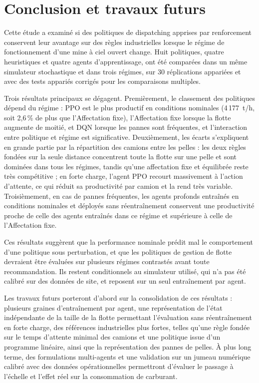 \documentclass[11pt,a4paper]{article}
\newif\ifrevmarks
\newcommand{\revtag}[1]{\ifrevmarks\textsuperscript{\textcolor{red!70!black}{\scriptsize[#1]}}\fi}
\newenvironment{revbloc}[1]{\par\ifrevmarks\color{revcolor}\noindent\revtag{#1}\ \fi}{\par}
\begin{document}
\section{Conclusion et travaux futurs}
\label{sec:conclusion}

\begin{revbloc}{M18, M23}
Cette étude a examiné si des politiques de dispatching apprises par renforcement conservent leur avantage sur des règles industrielles lorsque le régime de fonctionnement d'une mine à ciel ouvert change. Huit politiques, quatre heuristiques et quatre agents d'apprentissage, ont été comparées dans un même simulateur stochastique et dans trois régimes, sur 30 réplications appariées et avec des tests appariés corrigés pour les comparaisons multiples.

Trois résultats principaux se dégagent. Premièrement, le classement des politiques dépend du régime : PPO est le plus productif en conditions nominales (4\,177~t/h, soit 2,6\,\% de plus que l'Affectation fixe), l'Affectation fixe lorsque la flotte augmente de moitié, et DQN lorsque les pannes sont fréquentes, et l'interaction entre politique et régime est significative. Deuxièmement, les écarts s'expliquent en grande partie par la répartition des camions entre les pelles : les deux règles fondées sur la seule distance concentrent toute la flotte sur une pelle et sont dominées dans tous les régimes, tandis qu'une affectation fixe et équilibrée reste très compétitive ; en forte charge, l'agent PPO recourt massivement à l'action d'attente, ce qui réduit sa productivité par camion et la rend très variable. Troisièmement, en cas de pannes fréquentes, les agents profonds entraînés en conditions nominales et déployés sans réentraînement conservent une productivité proche de celle des agents entraînés dans ce régime et supérieure à celle de l'Affectation fixe.

Ces résultats suggèrent que la performance nominale prédit mal le comportement d'une politique sous perturbation, et que les politiques de gestion de flotte devraient être évaluées sur plusieurs régimes contrastés avant toute recommandation. Ils restent conditionnels au simulateur utilisé, qui n'a pas été calibré sur des données de site, et reposent sur un seul entraînement par agent.

Les travaux futurs porteront d'abord sur la consolidation de ces résultats : plusieurs graines d'entraînement par agent, une représentation de l'état indépendante de la taille de la flotte permettant l'évaluation sans réentraînement en forte charge, des références industrielles plus fortes, telles qu'une règle fondée sur le temps d'attente minimal des camions et une politique issue d'un programme linéaire, ainsi que la représentation des pannes de pelles. À plus long terme, des formulations multi-agents et une validation sur un jumeau numérique calibré avec des données opérationnelles permettront d'évaluer le passage à l'échelle et l'effet réel sur la consommation de carburant.
\end{revbloc}
\end{document}
